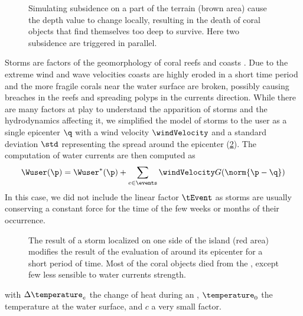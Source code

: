 \begin{figure}
    \caption{Simulating subsidence on a part of the terrain (brown area) cause the depth value to change locally, resulting in the death of coral objects that find themselves too deep to survive. Here two subsidence  are triggered in parallel. }
    \label{fig:env-obj_subsidence-event}
\end{figure}

Storms are factors of the geomorphology of coral reefs \cite{VilaConcejo2016, Oron2023} and coasts \cite{Dominguez2005, Cowart2010}. Due to the extreme wind and wave velocities coasts are highly eroded in a short time period and the more fragile corals near the water surface are broken, possibly causing breaches in the reefs and spreading polyps in the currents direction. While there are many factors at play to understand the apparition of storms and the hydrodynamics affecting it, we simplified the model of storms to the user as a single epicenter $\q$ with a wind velocity $\windVelocity$ and a standard deviation $\std$ representing the spread around the epicenter (\cref{fig:env-obj_storm-event}). The computation of water currents are then computed as 
\begin{align*}
    \Wuser(\p) = \Wuser^*(\p) + \sum_{e \in \events} {\windVelocity G(\norm{\p - \q})}
\end{align*}
In this case, we did not include the linear factor $\tEvent$ as storms are usually conserving a constant force for the time of the few weeks or months of their occurrence. 

\begin{figure}
    \caption{The result of a storm localized on one side of the island (red area) modifies the result of the evaluation of  around its epicenter for a short period of time. Most of the coral objects died from the , except few  less sensible to water currents strength. }
    \label{fig:env-obj_storm-event}
\end{figure}

with $\Delta \temperature_e$ the change of heat during an , $\temperature_0$ the temperature at the water surface, and $c$ a very small factor.

